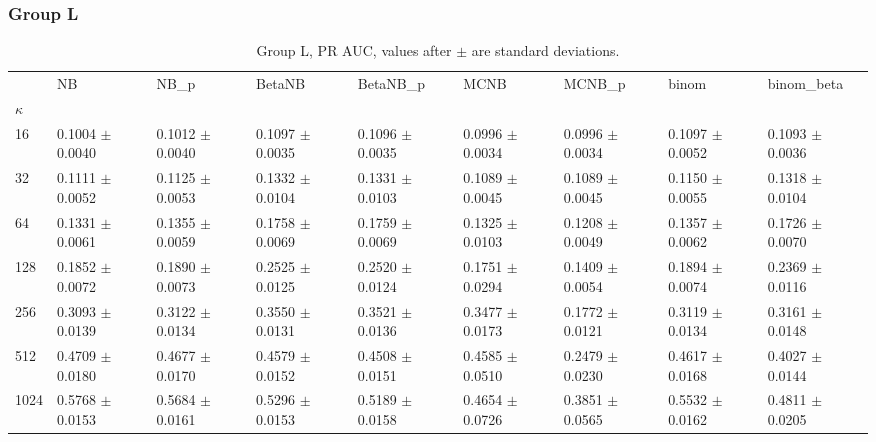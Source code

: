 \subsubsection*{Group L}
\begin{table}[H]
\centering
\begin{adjustbox}{max width=\linewidth}
\begin{tabular}{lllllllll}
\toprule
 & NB & NB\_p & BetaNB & BetaNB\_p & MCNB & MCNB\_p & binom & binom\_beta \\
$\kappa$ &  &  &  &  &  &  &  &  \\
\midrule
16 & 0.1004 $\pm$ 0.0040 & 0.1012 $\pm$ 0.0040 & 0.1097 $\pm$ 0.0035 & 0.1096 $\pm$ 0.0035 & 0.0996 $\pm$ 0.0034 & 0.0996 $\pm$ 0.0034 & 0.1097 $\pm$ 0.0052 & 0.1093 $\pm$ 0.0036 \\
32 & 0.1111 $\pm$ 0.0052 & 0.1125 $\pm$ 0.0053 & 0.1332 $\pm$ 0.0104 & 0.1331 $\pm$ 0.0103 & 0.1089 $\pm$ 0.0045 & 0.1089 $\pm$ 0.0045 & 0.1150 $\pm$ 0.0055 & 0.1318 $\pm$ 0.0104 \\
64 & 0.1331 $\pm$ 0.0061 & 0.1355 $\pm$ 0.0059 & 0.1758 $\pm$ 0.0069 & 0.1759 $\pm$ 0.0069 & 0.1325 $\pm$ 0.0103 & 0.1208 $\pm$ 0.0049 & 0.1357 $\pm$ 0.0062 & 0.1726 $\pm$ 0.0070 \\
128 & 0.1852 $\pm$ 0.0072 & 0.1890 $\pm$ 0.0073 & 0.2525 $\pm$ 0.0125 & 0.2520 $\pm$ 0.0124 & 0.1751 $\pm$ 0.0294 & 0.1409 $\pm$ 0.0054 & 0.1894 $\pm$ 0.0074 & 0.2369 $\pm$ 0.0116 \\
256 & 0.3093 $\pm$ 0.0139 & 0.3122 $\pm$ 0.0134 & 0.3550 $\pm$ 0.0131 & 0.3521 $\pm$ 0.0136 & 0.3477 $\pm$ 0.0173 & 0.1772 $\pm$ 0.0121 & 0.3119 $\pm$ 0.0134 & 0.3161 $\pm$ 0.0148 \\
512 & 0.4709 $\pm$ 0.0180 & 0.4677 $\pm$ 0.0170 & 0.4579 $\pm$ 0.0152 & 0.4508 $\pm$ 0.0151 & 0.4585 $\pm$ 0.0510 & 0.2479 $\pm$ 0.0230 & 0.4617 $\pm$ 0.0168 & 0.4027 $\pm$ 0.0144 \\
1024 & 0.5768 $\pm$ 0.0153 & 0.5684 $\pm$ 0.0161 & 0.5296 $\pm$ 0.0153 & 0.5189 $\pm$ 0.0158 & 0.4654 $\pm$ 0.0726 & 0.3851 $\pm$ 0.0565 & 0.5532 $\pm$ 0.0162 & 0.4811 $\pm$ 0.0205 \\
\bottomrule
\end{tabular}

\end{adjustbox}
\caption{Group L, PR AUC, values after $\pm$ are standard deviations.}
\end{table}

